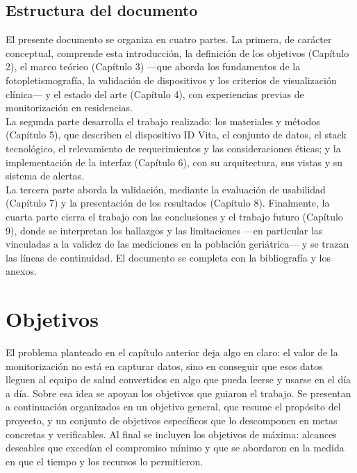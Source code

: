 \subsection{Estructura del documento}
El presente documento se organiza en cuatro partes. La primera, de carácter conceptual, comprende esta introducción, la definición de los objetivos (Capítulo 2), el marco teórico (Capítulo 3) —que aborda los fundamentos de la fotopletismografía, la validación de dispositivos y los criterios de visualización clínica— y el estado del arte (Capítulo 4), con experiencias previas de monitorización en residencias.\\

La segunda parte desarrolla el trabajo realizado: los materiales y métodos (Capítulo 5), que describen el dispositivo ID Vita, el conjunto de datos, el stack tecnológico, el relevamiento de requerimientos y las consideraciones éticas; y la implementación de la interfaz (Capítulo 6), con su arquitectura, sus vistas y su sistema de alertas.\\

La tercera parte aborda la validación, mediante la evaluación de usabilidad (Capítulo 7) y la presentación de los resultados (Capítulo 8). Finalmente, la cuarta parte cierra el trabajo con las conclusiones y el trabajo futuro (Capítulo 9), donde se interpretan los hallazgos y las limitaciones —en particular las vinculadas a la validez de las mediciones en la población geriátrica— y se trazan las líneas de continuidad. El documento se completa con la bibliografía y los anexos.\\


\section{Objetivos}
El problema planteado en el capítulo anterior deja algo en claro: el valor de la monitorización no está en capturar datos, sino en conseguir que esos datos lleguen al equipo de salud convertidos en algo que pueda leerse y usarse en el día a día. Sobre esa idea se apoyan los objetivos que guiaron el trabajo. Se presentan a continuación organizados en un objetivo general, que resume el propósito del proyecto, y un conjunto de objetivos específicos que lo descomponen en metas concretas y verificables. Al final se incluyen los objetivos de máxima: alcances deseables que excedían el compromiso mínimo y que se abordaron en la medida en que el tiempo y los recursos lo permitieron.\\


